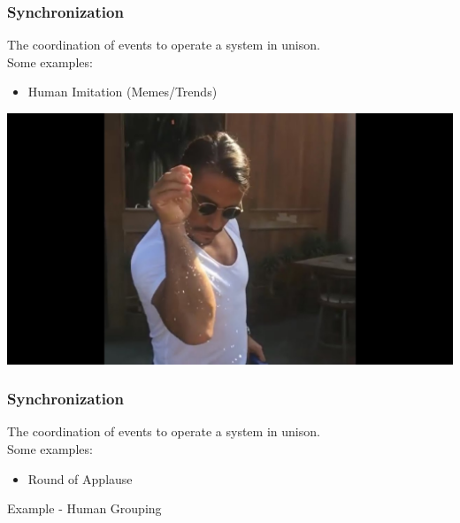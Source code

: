 \documentclass[xcolor=dvipsnames]{beamer}
\begin{document}
\begin{frame}
	\frametitle{Synchronization}
	The coordination of events to operate a system in unison.\\ 
	Some examples:
	\begin{itemize}
		\item Human Imitation (Memes/Trends) 
	\end{itemize}
	\begin{center}
	\includegraphics[scale=0.15]{images/salt_guy.jpg}
	\end{center}
\end{frame}

\begin{frame}
	\frametitle{Synchronization}
	The coordination of events to operate a system in unison.\\ 
	Some examples:
	\begin{itemize}
		\item Round of Applause
	\end{itemize}
\end{frame}


\begin{frame}{Example - Human Grouping}
\end{frame}
\end{document}
